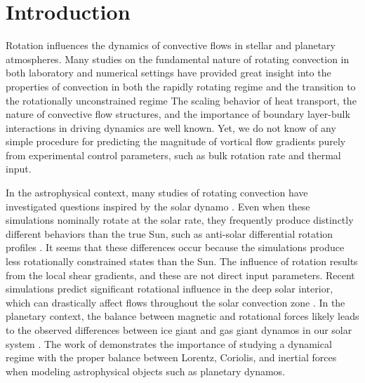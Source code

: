 \documentclass[twocolumn, amsmath, amsfonts, amssymb, trackchanges]{aastex62}
\begin{document}
\section{Introduction}
\label{sec:intro}
Rotation influences the dynamics of convective flows in
stellar and planetary atmospheres.
Many studies on the fundamental nature of
rotating convection in both laboratory and numerical settings
have provided great insight into the properties of convection 
in both the rapidly rotating regime 
and the transition to the rotationally unconstrained regime 
\citep{king&all2009, zhong&all2009, schmitz&tilgner2009, king&all2012, julien&all2012, king&all2013, ecke&niemela2014, stellmach&all2014, cheng&all2015, gastine&all2016}
The scaling behavior of heat transport, the nature of convective flow
structures, and the importance of boundary layer-bulk interactions in driving dynamics are well known.
Yet, we do not know of any simple procedure for predicting the magnitude of vortical flow gradients 
purely from experimental control parameters, such as bulk rotation rate and thermal input.

In the astrophysical context,
many studies of rotating convection have investigated questions inspired by the solar dynamo
\citep{glatzmaier&gilman1982, busse2002, brown&all2008,
brown&all2010, brown&all2011, augustson&all2012, guerrero&all2013, kapyla&all2014}.
Even when these simulations nominally rotate at the solar rate,
they frequently produce distinctly different behaviors than the true Sun,
such as anti-solar differential rotation profiles  \citep{gastine&all2014, brun&all2017}.
It seems that these differences occur because the simulations produce less rotationally 
constrained states than the Sun. 
The influence of rotation results from the local 
shear gradients, and these are not direct input parameters.
Recent simulations predict significant rotational influence in the deep solar interior, 
which can drastically affect flows throughout the solar convection zone 
\citep{featherstone&hindman2016, greer&all2016}. 
In the planetary context, the balance between magnetic
and rotational forces likely leads to the observed differences between ice
giant and gas giant dynamos in our solar system \citep{soderlund&all2015}.
The work of \cite{aurnou&king2017} demonstrates the importance of studying a dynamical regime
with the proper balance between Lorentz, Coriolis, and inertial forces when modeling
astrophysical objects such as planetary dynamos.
\end{document}
